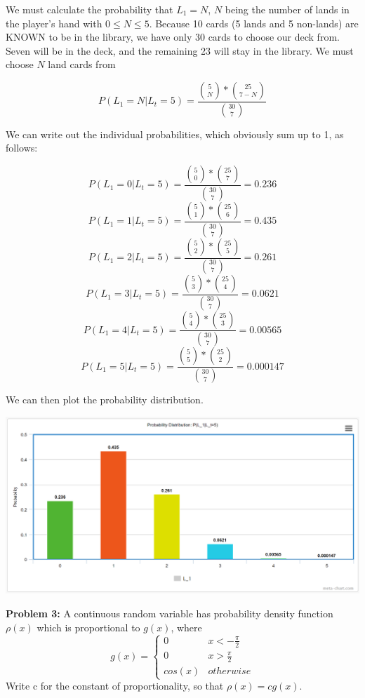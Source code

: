 \documentclass{article}
\begin{document}
 We must calculate the probability that $L_1=N$, $N$ being the number of lands in the player's hand with $0 \leq N \leq 5$. Because 10 cards (5 lands and 5 non-lands) are KNOWN to be in the library, we have only 30 cards to choose our deck from. Seven will be in the deck, and the remaining 23 will stay in the library. We must choose $N$ land cards from 
 
 \begin{displaymath}
    P(L_1=N|L_t=5)=\frac{{5 \choose N}*{25 \choose 7-N}}{{30 \choose 7}}
 \end{displaymath}
 
 We can write out the individual probabilities, which obviously sum up to 1, as follows:
 
 \[P(L_1=0|L_t=5)=\frac{{5 \choose 0}*{25 \choose 7}}{{30 \choose 7}}=0.236\]
 \[P(L_1=1|L_t=5)=\frac{{5 \choose 1}*{25 \choose 6}}{{30 \choose 7}}=0.435\]
 \[P(L_1=2|L_t=5)=\frac{{5 \choose 2}*{25 \choose 5}}{{30 \choose 7}}=0.261\]
 \[P(L_1=3|L_t=5)=\frac{{5 \choose 3}*{25 \choose 4}}{{30 \choose 7}}=0.0621\]
 \[P(L_1=4|L_t=5)=\frac{{5 \choose 4}*{25 \choose 3}}{{30 \choose 7}}=0.00565\]
 \[P(L_1=5|L_t=5)=\frac{{5 \choose 5}*{25 \choose 2}}{{30 \choose 7}}=0.000147\]
 
 We can then plot the probability distribution.

 \includegraphics[scale=0.565]{HW4_4.PNG}\newline
 
 \newpage

 \begin{center}
      \Large\textbf{Problem 3:} A continuous random variable has probability density function $\rho(x)$ which is proportional to $g(x)$, where
      \[ 
        g(x)=
        \begin{cases} 
            0 & x < -\frac{\pi}{2} \\
            0 & x > \frac{\pi}{2} \\
            cos(x) & otherwise
        \end{cases}
      \]
      Write c for the constant of proportionality, so that $\rho(x)=cg(x)$.
      \par
 \end{center}
\end{document}
